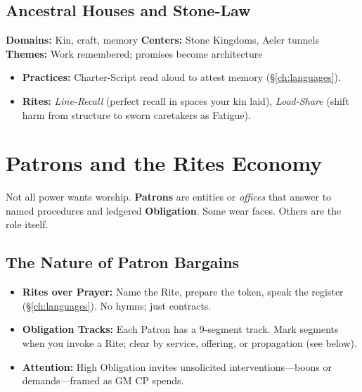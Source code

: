 \begin{multicols}{2}
\subsection*{Ancestral Houses and Stone-Law}
\textbf{Domains:} Kin, craft, memory \quad
\textbf{Centers:} Stone Kingdoms, Aeler tunnels \\
\textbf{Themes:} Work remembered; promises become architecture
\begin{itemize}
  \item \textbf{Practices:} Charter-Script read aloud to attest memory (\S\ref{ch:languages}). 
  \item \textbf{Rites:} \emph{Line-Recall} (perfect recall in spaces your kin laid), \emph{Load-Share} (shift harm from structure to sworn caretakers as Fatigue).
\end{itemize}

\section{Patrons and the Rites Economy}
Not all power wants worship. \textbf{Patrons} are entities or \emph{offices} that answer to named procedures and ledgered \textbf{Obligation}. Some wear faces. Others are the role itself.

\subsection*{The Nature of Patron Bargains}
\begin{itemize}
  \item \textbf{Rites over Prayer:} Name the Rite, prepare the token, speak the register (\S\ref{ch:languages}). No hymns; just contracts. 
  \item \textbf{Obligation Tracks:} Each Patron has a 9-segment track. Mark segments when you invoke a Rite; clear by service, offering, or propagation (see below).
  \item \textbf{Attention:} High Obligation invites unsolicited interventions—boons or demands—framed as GM CP spends.
\end{itemize}


\end{multicols}
